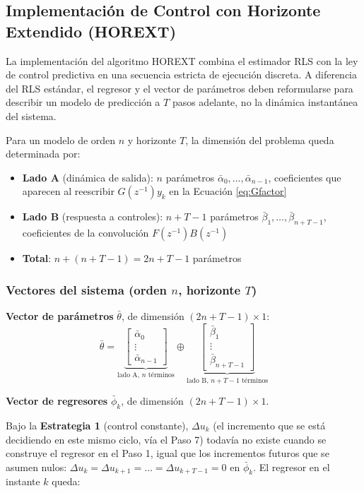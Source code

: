 \subsection{Implementación de Control con Horizonte Extendido (HOREXT)}

La implementación del algoritmo HOREXT combina el estimador RLS con la ley de control predictiva en una secuencia estricta de ejecución discreta. A diferencia del RLS estándar, el regresor y el vector de parámetros deben reformularse para describir un modelo de predicción a $T$ pasos adelante, no la dinámica instantánea del sistema.

Para un modelo de orden $n$ y horizonte $T$, la dimensión del problema queda determinada por:
\begin{itemize}
    \item \textbf{Lado A} (dinámica de salida): $n$ parámetros $\bar{\alpha}_0, \ldots, \bar{\alpha}_{n-1}$, coeficientes que aparecen al reescribir $G(z^{-1})y_k$ en la Ecuación \ref{eq:Gfactor}
    \item \textbf{Lado B} (respuesta a controles): $n + T - 1$ parámetros $\bar{\beta}_1, \ldots, \bar{\beta}_{n+T-1}$, coeficientes de la convolución $F(z^{-1})B(z^{-1})$
    \item \textbf{Total}: $n + (n + T - 1) = 2n + T - 1$ parámetros
\end{itemize}

\subsubsection*{Vectores del sistema (orden $n$, horizonte $T$)}

\textbf{Vector de parámetros} $\bar{\theta}$, de dimensión $(2n+T-1) \times 1$:
\[
    \bar{\theta} =
    \underbrace{\begin{bmatrix} \bar{\alpha}_0 \\ \vdots \\ \bar{\alpha}_{n-1} \end{bmatrix}}_{\text{lado A, }n\text{ términos}}
    \oplus
    \underbrace{\begin{bmatrix} \bar{\beta}_1 \\ \vdots \\ \bar{\beta}_{n+T-1} \end{bmatrix}}_{\text{lado B, }n+T-1\text{ términos}}
\]

\textbf{Vector de regresores} $\bar{\phi}_k$, de dimensión $(2n+T-1) \times 1$.

Bajo la \textbf{Estrategia 1} (control constante), $\Delta u_k$ (el incremento que se está decidiendo en este mismo ciclo, vía el Paso 7) todavía no existe cuando se construye el regresor en el Paso 1, igual que los incrementos futuros que se asumen nulos: $\Delta u_k = \Delta u_{k+1} = \ldots = \Delta u_{k+T-1} = 0$ en $\bar\phi_k$. El regresor en el instante $k$ queda:

